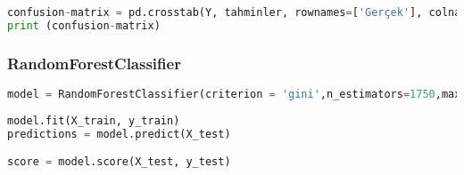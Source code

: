 \documentclass[onecolumn]{article}
\begin{document}
\begin{lstlisting}[language=Python, caption= modeling] 
confusion-matrix = pd.crosstab(Y, tahminler, rownames=['Gerçek'], colnames=['Tahmin'])
print (confusion-matrix)
\end{lstlisting}

\subsubsection{RandomForestClassifier}

\begin{lstlisting}[language=Python, caption=  RandomForestClassifier ] 
model = RandomForestClassifier(criterion = 'gini',n_estimators=1750,max_depth=7,min_samples_split =6, min_samples_leaf = 6, max_features = 'auto', oob_score= True, random_state=42, n_jobs=-1,verbose =1)
            
model.fit(X_train, y_train)
predictions = model.predict(X_test)  

score = model.score(X_test, y_test)
\end{lstlisting}
\end{document}
